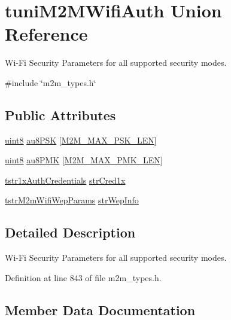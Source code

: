 \hypertarget{uniontuniM2MWifiAuth}{}\section{tuni\+M2\+M\+Wifi\+Auth Union Reference}
\label{uniontuniM2MWifiAuth}


Wi-\/\+Fi Security Parameters for all supported security modes.  




{\ttfamily \#include \char`\"{}m2m\+\_\+types.\+h\char`\"{}}

\subsection*{Public Attributes}
\begin{DoxyCompactItemize}
\item 
\hyperlink{group__DataT_ga4df709a77647e870bbf1d955b8edc9a6}{uint8} \hyperlink{uniontuniM2MWifiAuth_a690bf7d430705e5564cf5df90197a59c}{au8\+P\+SK} \mbox{[}\hyperlink{group__WlanDefines_ga790a7e0471ff8a179238863dc2021f6d}{M2\+M\+\_\+\+M\+A\+X\+\_\+\+P\+S\+K\+\_\+\+L\+EN}\mbox{]}
\item 
\hyperlink{group__DataT_ga4df709a77647e870bbf1d955b8edc9a6}{uint8} \hyperlink{uniontuniM2MWifiAuth_a69944bf252794877fc76c4e84dd6c2c2}{au8\+P\+MK} \mbox{[}\hyperlink{group__WlanDefines_ga160183536c79910c9743ac0acf863e5d}{M2\+M\+\_\+\+M\+A\+X\+\_\+\+P\+M\+K\+\_\+\+L\+EN}\mbox{]}
\item 
\hyperlink{structtstr1xAuthCredentials}{tstr1x\+Auth\+Credentials} \hyperlink{uniontuniM2MWifiAuth_a6200150169d009f5da0d51be9e7dee15}{str\+Cred1x}
\item 
\hyperlink{structtstrM2mWifiWepParams}{tstr\+M2m\+Wifi\+Wep\+Params} \hyperlink{uniontuniM2MWifiAuth_aa2cfdea0ab317d0a2b20274fdedd20b2}{str\+Wep\+Info}
\end{DoxyCompactItemize}


\subsection{Detailed Description}
Wi-\/\+Fi Security Parameters for all supported security modes. 

Definition at line 843 of file m2m\+\_\+types.\+h.



\subsection{Member Data Documentation}
\mbox{\label{uniontuniM2MWifiAuth_a69944bf252794877fc76c4e84dd6c2c2}} 
